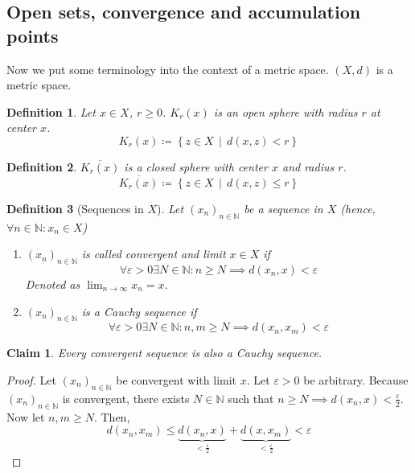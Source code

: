 \documentclass{article}
\newtheorem{definition}{Definition}  \numberwithin{definition}{section}
\newtheorem*{claim}{Claim}%
\newcommand{\setdef}[2]{\left\{\left.#1\,\middle|\,#2\right.\right\}}
\begin{document}
\subsection{Open sets, convergence and accumulation points}

Now we put some terminology into the context of a metric space.
$(X, d)$ is a metric space.

\begin{definition}
  Let $x \in X$, $r \geq 0$.
  $K_r(x)$ is an \emph{open sphere} with radius $r$ at center $x$.
  \[ K_r(x) \coloneqq \setdef{z \in X}{d(x, z) < r} \]
\end{definition}

\begin{definition} $\overline{K_r(x)}$ is a closed sphere with center $x$ and radius $r$.
  \[ \overline{K_r(x)} \coloneqq \setdef{z \in X}{d(x, z) \leq r} \]
\end{definition}

\begin{definition}[Sequences in $X$]
  Let $(x_n)_{n\in\mathbb N}$ be a sequence in $X$ (hence, $\forall n \in \mathbb N: x_n \in X$)
  \begin{enumerate}
    \item $(x_n)_{n\in\mathbb N}$ is called \emph{convergent} and limit $x \in X$ if
      \[ \forall \varepsilon > 0 \exists N \in \mathbb N: n \geq N \implies d(x_n, x) < \varepsilon \]
      Denoted as $\lim_{n\to\infty} x_n = x$.
    \item $(x_n)_{n\in\mathbb N}$ is a Cauchy sequence if
      \[ \forall \varepsilon > 0 \exists N \in \mathbb N: n, m \geq N \implies d(x_n, x_m) < \varepsilon \]
  \end{enumerate}
\end{definition}

\begin{claim}
  Every convergent sequence is also a Cauchy sequence.
\end{claim}

\begin{proof}
  Let $(x_n)_{n\in\mathbb N}$ be convergent with limit $x$. Let $\varepsilon > 0$ be arbitrary.
  Because $(x_n)_{n\in\mathbb N}$ is convergent, there exists $N \in \mathbb N$ such that $n \geq N \implies d(x_n, x) < \frac{\varepsilon}{2}$.
  Now let $n,m \geq N$. Then,
  \[ d(x_n, x_m) \leq \underbrace{d(x_n, x)}_{< \frac{\varepsilon}2} + \underbrace{d(x, x_m)}_{< \frac\varepsilon2} < \varepsilon \]
\end{proof}
\end{document}

